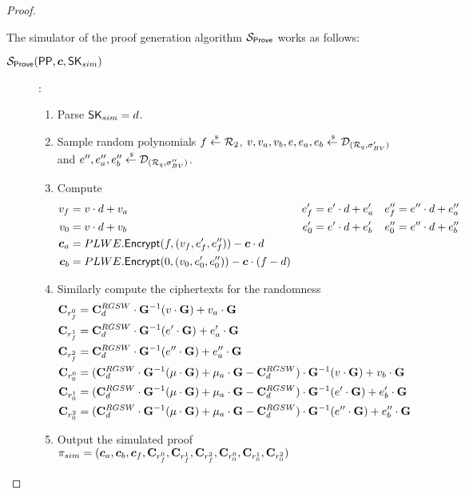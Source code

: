 \begin{proof}
\begin{description}
    The simulator of the proof generation algorithm $\mathcal{S}_{{\mathsf{Prove}}}$ works as follows:
    \begin{description}
    \item[$\mathcal{S}_{\Prove}(\PPP, \vec{c}, \SK_{sim})$]:
      \begin{enumerate}
      \item Parse $\mathsf{SK}_{sim} = d$.
      \item Sample random polynomials $f \stackrel{{\scriptscriptstyle \mkern4mu \$}}{\gets} {\mathcal{R}}_2$, $v,v_a, v_b, e, e_a, e_b \stackrel{{\scriptscriptstyle \mkern4mu \$}}{\gets} \mathcal{D}_{({\mathcal{R}}_q, \sigma_{BV}')}$ and $e'', e_a'', e_b'' \stackrel{{\scriptscriptstyle \mkern4mu \$}}{\gets} \mathcal{D}_{({\mathcal{R}}_q, \sigma_{BV}'')}$.
      \item Compute
        \begin{align*}
          v_f &= v \cdot d + v_a & e_f' &= e' \cdot d + e_a' & e_f'' &= e'' \cdot d + e_a''\\
          v_0 &= v \cdot d + v_b & e_0' &= e' \cdot d + e_b' & e_0'' &= e'' \cdot d + e_b''\\
          \vec{c}_a &= PLWE.\Enc(f, (v_f, e_f', e_f'')) - \vec{c} \cdot d \\
          \vec{c}_b &= PLWE.\Enc(0, (v_0, e_0', e_0'')) - \vec{c} \cdot (f - d)
        \end{align*}
      \item Similarly compute the ciphertexts for the randomness
        \begin{align*}
          \mathbf{C}_{r_f^0} &= \mathbf{C}_d^{RGSW} \cdot \mathbf{G}^{-1}(v \cdot \mathbf{G}) + v_a \cdot \mathbf{G} \\
          \mathbf{C}_{r_f^1} &= \mathbf{C}_d^{RGSW} \cdot \mathbf{G}^{-1}(e' \cdot \mathbf{G}) + e_a' \cdot \mathbf{G} \\
          \mathbf{C}_{r_f^2} &= \mathbf{C}_d^{RGSW} \cdot \mathbf{G}^{-1}(e'' \cdot \mathbf{G}) + e_a'' \cdot \mathbf{G} \\
          \mathbf{C}_{r_0^0} &= (\mathbf{C}_d^{RGSW} \cdot \mathbf{G}^{-1}(\mu \cdot \mathbf{G}) + \mu_a \cdot \mathbf{G} - \mathbf{C}_d^{RGSW}) \cdot \mathbf{G}^{-1}(v \cdot \mathbf{G}) + v_b \cdot \mathbf{G} \\
          \mathbf{C}_{r_0^1} &= (\mathbf{C}_d^{RGSW} \cdot \mathbf{G}^{-1}(\mu \cdot \mathbf{G}) + \mu_a \cdot \mathbf{G} - \mathbf{C}_d^{RGSW}) \cdot \mathbf{G}^{-1}(e' \cdot \mathbf{G}) + e_b' \cdot \mathbf{G} \\
          \mathbf{C}_{r_0^2} &= (\mathbf{C}_d^{RGSW} \cdot \mathbf{G}^{-1}(\mu \cdot \mathbf{G}) + \mu_a \cdot \mathbf{G} - \mathbf{C}_d^{RGSW}) \cdot \mathbf{G}^{-1}(e'' \cdot \mathbf{G}) + e_b'' \cdot \mathbf{G}
        \end{align*}
      \item Output the simulated proof $\pi_{sim} = (\vec{c}_a, \vec{c}_b, \vec{c}_f, \mat{C}_{r_f^0}, \mat{C}_{r_f^1}, \mat{C}_{r_f^2}, \mat{C}_{r_0^0}, \mat{C}_{r_0^1}, \mat{C}_{r_0^2})$
      \end{enumerate}
    \end{description}


\end{description}
\end{proof}
